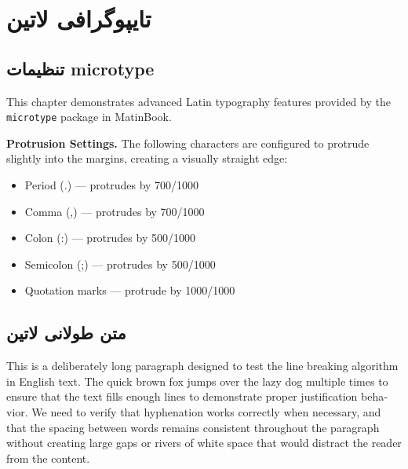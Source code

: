 \documentclass{matinbook}
\begin{document}
\chapter{تایپوگرافی لاتین}
\label{chap:typography-latin}

\section{تنظیمات microtype}
\label{sec:typography-microtype-latin}

\begin{latin}
This chapter demonstrates advanced Latin typography features
provided by the \texttt{microtype} package in MatinBook.

\textbf{Protrusion Settings.}
The following characters are configured to protrude slightly
into the margins, creating a visually straight edge:

\begin{itemize}
    \item Period (.) --- protrudes by 700/1000
    \item Comma (,) --- protrudes by 700/1000
    \item Colon (:) --- protrudes by 500/1000
    \item Semicolon (;) --- protrudes by 500/1000
    \item Quotation marks --- protrude by 1000/1000
\end{itemize}
\end{latin}

\section{متن طولانی لاتین}
\label{sec:typography-longtext-latin}

\begin{latin}
This is a deliberately long paragraph designed to test the line
breaking algorithm in English text. The quick brown fox jumps
over the lazy dog multiple times to ensure that the text fills
enough lines to demonstrate proper justification behavior. We
need to verify that hyphenation works correctly when necessary,
and that the spacing between words remains consistent
throughout the paragraph without creating large gaps or rivers
of white space that would distract the reader from the content.
\end{latin}
\end{document}
